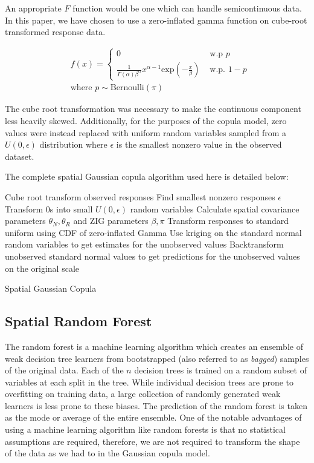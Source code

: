 \documentclass{article}
\begin{document}
An appropriate $F$ function would be one which can handle semicontinuous data.
In this paper, we have chosen to use a zero-inflated gamma function on cube-root transformed response data.

\begin{align*}
&f(x) = 
\begin{cases}
	0 & \text{ w.p } p \\
	\frac{1}{\Gamma(\alpha) \beta^\alpha} x^{\alpha -1} \text{exp}\left(-\frac{x}{\beta}\right) & \text{ w.p. } 1 - p 
\end{cases} 
\\
&\text{where } p \sim \text{Bernoulli}(\pi)
\end{align*}

The cube root transformation was necessary to make the continuous component less heavily skewed.
Additionally, for the purposes of the copula model, zero values were instead replaced with uniform random variables sampled from a $U(0, \epsilon)$ distribution where $\epsilon$ is the smallest nonzero value in the observed dataset.

The complete spatial Gaussian copula algorithm used here is detailed below:

\begin{algorithm}[H]
\SetAlgoLined
{}
 {
	Cube root transform observed responses\; 
	Find smallest nonzero responses $\epsilon$ \;
	Transform 0s into small $U(0, \epsilon)$ random variables\;
	Calculate spatial covariance parameters $\theta_N, \theta_R$ and ZIG parameters $\beta, \pi$\;
	Transform responses to standard uniform using CDF of zero-inflated Gamma\; 
	Use kriging on the standard normal random variables to get estimates for the unobserved values \;
	Backtransform unobserved standard normal values to get predictions for the unobserved values on the original scale\; 
}
	\caption{Spatial Gaussian Copula}
\end{algorithm}


\subsection{Spatial Random Forest}
The random forest is a machine learning algorithm which creates an ensemble of weak decision tree learners from bootstrapped (also referred to as \textit{bagged}) samples of the original data\cite{breiman01}.
Each of the $n$ decision trees is trained on a random subset of variables at each split in the tree.
While individual decision trees are prone to overfitting on training data, a large collection of randomly generated weak learners is less prone to these biases.
The prediction of the random forest is taken as the mode or average of the entire ensemble.
One of the notable advantages of using a machine learning algorithm like random forests is that no statistical assumptions are required, therefore, we are not required to transform the shape of the data as we had to in the Gaussian copula model.
\end{document}
